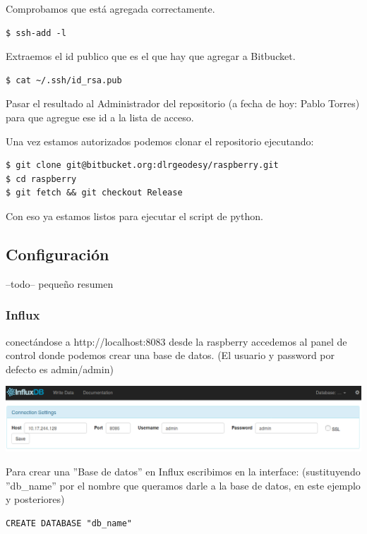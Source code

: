 \documentclass[12pt, a4paper, oneside, titlepage]{article}
\begin{document}
Comprobamos que está agregada correctamente.
\begin{lstlisting}
$ ssh-add -l 
\end{lstlisting}

Extraemos el id publico que es el que hay que agregar a Bitbucket. 
\begin{lstlisting}
$ cat ~/.ssh/id_rsa.pub
\end{lstlisting}

Pasar el resultado al Administrador del repositorio (a fecha de hoy: Pablo Torres) para que agregue ese id a la lista de acceso. 

Una vez estamos autorizados podemos clonar el repositorio ejecutando:

\begin{lstlisting}
$ git clone git@bitbucket.org:dlrgeodesy/raspberry.git
$ cd raspberry
$ git fetch && git checkout Release
\end{lstlisting}

Con eso ya estamos listos para ejecutar el script de python.

\subsection{Configuración}
--todo-- pequeño resumen

\subsubsection{Influx}

 
conectándose a http://localhost:8083 desde la raspberry accedemos al panel de control donde podemos crear una base de datos.  (El usuario y password por defecto es admin/admin)


\includegraphics[width=0.9\linewidth,keepaspectratio]{img/influx_1.png}

Para crear una ''Base de datos'' en Influx escribimos en la interface: (sustituyendo ''db\_name'' por el nombre que queramos darle a la base de datos, en este ejemplo y posteriores)

\begin{lstlisting}
CREATE DATABASE "db_name"
\end{lstlisting}
 
\end{document}
